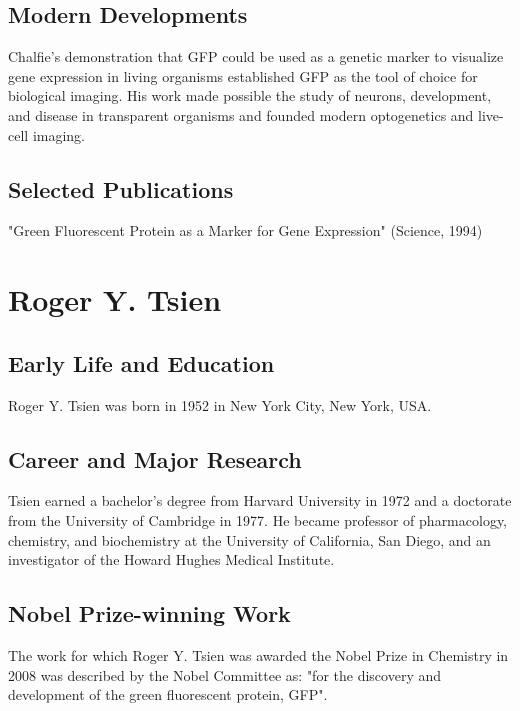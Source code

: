 \subsection*{Modern Developments}

Chalfie's demonstration that GFP could be used as a genetic marker to visualize gene expression in living organisms established GFP as the tool of choice for biological imaging. His work made possible the study of neurons, development, and disease in transparent organisms and founded modern optogenetics and live-cell imaging.

\subsection*{Selected Publications}

"Green Fluorescent Protein as a Marker for Gene Expression" (Science, 1994)

\clearpage

\section{Roger Y. Tsien}

\subsection*{Early Life and Education}

Roger Y. Tsien was born in 1952 in New York City, New York, USA.

\subsection*{Career and Major Research}

Tsien earned a bachelor's degree from Harvard University in 1972 and a doctorate from the University of Cambridge in 1977. He became professor of pharmacology, chemistry, and biochemistry at the University of California, San Diego, and an investigator of the Howard Hughes Medical Institute.

\subsection*{Nobel Prize-winning Work}

The work for which Roger Y. Tsien was awarded the Nobel Prize in Chemistry in 2008 was described by the Nobel Committee as: "for the discovery and development of the green fluorescent protein, GFP".

